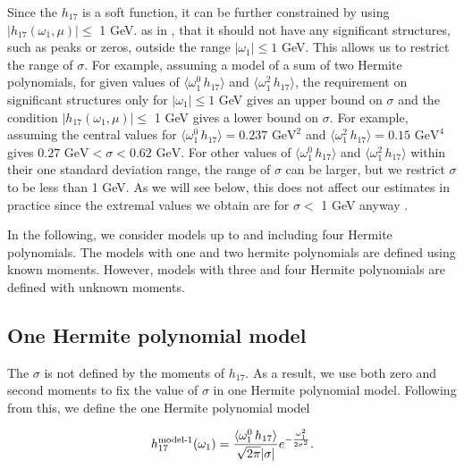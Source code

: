 Since the $h_{17}$ is a soft function, it can be further constrained by using $|h_{17}(\omega_1,\mu)|\leq$ 1 GeV. as in \cite{Benzke:2010js}, that it should not have any significant structures, such as peaks or zeros, outside the range $|\omega_1|\leq 1$ GeV. This allows us to restrict the range of $\sigma$. For example, assuming a model of a sum of two Hermite polynomials, for given values of $\langle\omega_1^0\,h_{17}\rangle$ and $\langle\omega_1^2\,h_{17}\rangle$, the requirement on significant structures only for $|\omega_1|\leq 1$ GeV gives an upper bound on $\sigma$ and the condition $|h_{17}(\omega_1,\mu)|\leq$ 1 GeV gives a lower bound on $\sigma$. For example, assuming the central values for  $\langle\omega_1^0\,h_{17}\rangle=0.237 \mbox{ GeV}^2$ and $\langle\omega_1^2\,h_{17}\rangle=0.15\mbox{ GeV}^4$ gives $0.27\mbox{ GeV}<\sigma<0.62\mbox{ GeV}$. For other values of $\langle\omega_1^0\,h_{17}\rangle$ and   $\langle\omega_1^2\,h_{17}\rangle$ within their one standard deviation range, the range of $\sigma$ can be larger, but we restrict $\sigma$ to be less than 1 GeV. As we will see below, this does not affect our estimates in practice since the extremal values we obtain are for $\sigma<$ 1 GeV anyway \cite{Gunawardana:2019gep}.\par
In the following, we consider models up to and including four Hermite polynomials. The models with one and two hermite polynomials are defined using known moments. However, models with three and four Hermite polynomials are defined with unknown moments. 

\subsection{One Hermite polynomial model }

The $\sigma$ is not defined by the moments of $h_{17}$. As a result, we use both zero and second moments to fix the value of $\sigma$ in one Hermite polynomial model. Following from this, we define the one Hermite polynomial model 

\begin{equation}
h^{\mbox{\scriptsize model-1}}_{17}(\omega_1)=\frac{\langle\omega_1^0\,h_{17}\rangle}{\sqrt{2\pi}|\sigma|}e^{-\frac{\omega_1^2}{2\sigma^2}}.
\end{equation}

